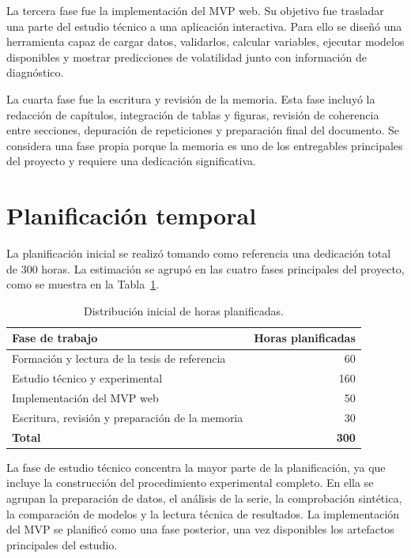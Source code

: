 La tercera fase fue la implementación del MVP web. Su objetivo fue trasladar una parte del estudio técnico a una aplicación interactiva. Para ello se diseñó una herramienta capaz de cargar datos, validarlos, calcular variables, ejecutar modelos disponibles y mostrar predicciones de volatilidad junto con información de diagnóstico.

La cuarta fase fue la escritura y revisión de la memoria. Esta fase incluyó la redacción de capítulos, integración de tablas y figuras, revisión de coherencia entre secciones, depuración de repeticiones y preparación final del documento. Se considera una fase propia porque la memoria es uno de los entregables principales del proyecto y requiere una dedicación significativa.

\section{Planificación temporal}\label{sec:planificacion-temporal}

La planificación inicial se realizó tomando como referencia una dedicación total de 300 horas. La estimación se agrupó en las cuatro fases principales del proyecto, como se muestra en la Tabla~\ref{tab:planificacion-horas-inicial}.

\begin{table}[ht]
\centering
\begin{tabular}{l r}
\hline
\textbf{Fase de trabajo} & \textbf{Horas planificadas} \\
\hline
Formación y lectura de la tesis de referencia & 60 \\
Estudio técnico y experimental & 160 \\
Implementación del MVP web & 50 \\
Escritura, revisión y preparación de la memoria & 30 \\
\hline
\textbf{Total} & \textbf{300} \\
\hline
\end{tabular}
\caption{Distribución inicial de horas planificadas.}
\label{tab:planificacion-horas-inicial}
\end{table}

La fase de estudio técnico concentra la mayor parte de la planificación, ya que incluye la construcción del procedimiento experimental completo. En ella se agrupan la preparación de datos, el análisis de la serie, la comprobación sintética, la comparación de modelos y la lectura técnica de resultados. La implementación del MVP se planificó como una fase posterior, una vez disponibles los artefactos principales del estudio.

